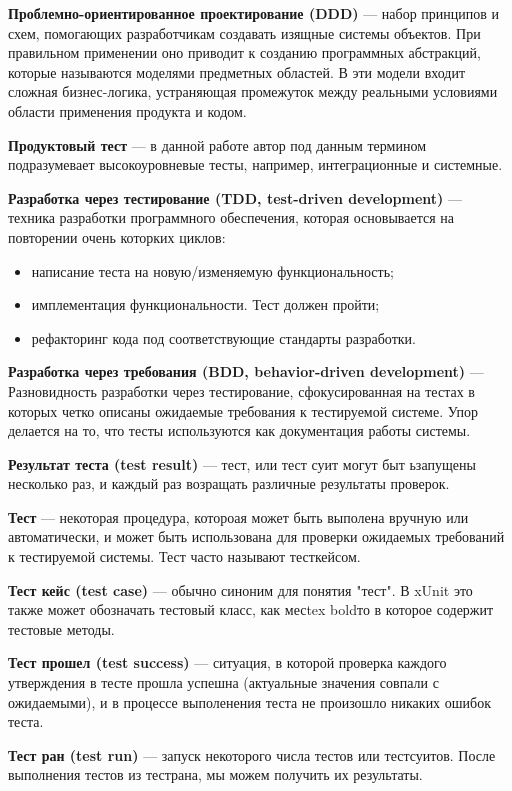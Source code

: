 {\bf Проблемно-ориентированное проектирование (DDD)} --- набор принципов и схем, помогающих разработчикам создавать изящные системы объектов. При правильном применении оно приводит к созданию программных абстракций, которые называются моделями предметных областей. В эти модели входит сложная бизнес-логика, устраняющая промежуток между реальными условиями области применения продукта и кодом.

{\bf Продуктовый тест} --- в данной работе автор под данным термином подразумевает высокоуровневые тесты, например, интеграционные и системные.

{\bf Разработка через тестирование (TDD, test-driven development)} ---
техника разработки программного обеспечения, которая основывается на повторении очень которких циклов:

\begin{itemize}
\item написание теста на новую/изменяемую функциональность;
\item имплементация функциональности. Тест должен пройти;
\item рефакторинг кода под соответствующие стандарты разработки.
\end{itemize}

{\bf Разработка через требования (BDD, behavior-driven development)} ---
Разновидность разработки через тестирование, сфокусированная на тестах в которых четко описаны ожидаемые требования к тестируемой системе. Упор делается на то, что тесты используются как документация работы системы.

{\bf Результат теста (test result)} ---
тест, или тест суит могут быт ьзапущены несколько раз, и каждый раз возращать различные результаты проверок.

{\bf Тест} ---
некоторая процедура, котороая может быть выполена вручную или автоматически, и может быть использована для проверки ожидаемых требований к тестируемой системы. Тест часто называют тесткейсом.

{\bf Тест кейс (test case)} ---
обычно синоним для понятия "тест". В xUnit это также может обозначать тестовый класс, как месtex boldто в которое содержит тестовые методы.

{\bf Тест прошел (test success)} ---
ситуация, в которой проверка каждого утверждения в тесте прошла успешна (актуальные значения совпали с ожидаемыми), и в процессе выполенения теста не произошло никаких ошибок теста.

{\bf Тест ран (test run)} ---
запуск некоторого числа тестов или тестсуитов. После выполнения тестов из тестрана, мы можем получить их результаты.

